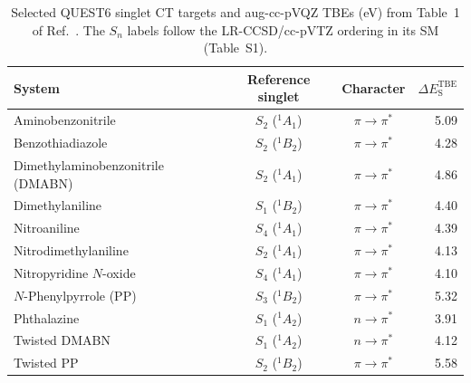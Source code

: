 \begin{table}[htbp]
\centering
\caption{Selected QUEST6 singlet CT targets and aug-cc-pVQZ TBEs (eV) from Table~1 of Ref.~. The $S_n$ labels follow the LR-CCSD/cc-pVTZ ordering in its SM (Table~S1).}
\label{tab:si_states_quest6}
\small
\setlength{\tabcolsep}{6pt}
\begin{tabular}{@{}lccr@{}}
\hline
System & Reference singlet & Character & $\Delta E_{\mathrm{S}}^{\mathrm{TBE}}$ \\
\hline
Aminobenzonitrile & $S_{2}$ (${}^{1}A_1$) & $\pi\to\pi^*$ & 5.09 \\
Benzothiadiazole & $S_{2}$ (${}^{1}B_2$) & $\pi\to\pi^*$ & 4.28 \\
Dimethylaminobenzonitrile (DMABN) & $S_{2}$ (${}^{1}A_1$) & $\pi\to\pi^*$ & 4.86 \\
Dimethylaniline & $S_{1}$ (${}^{1}B_2$) & $\pi\to\pi^*$ & 4.40 \\
Nitroaniline & $S_{4}$ (${}^{1}A_1$) & $\pi\to\pi^*$ & 4.39 \\
Nitrodimethylaniline & $S_{2}$ (${}^{1}A_1$) & $\pi\to\pi^*$ & 4.13 \\
Nitropyridine $N$-oxide & $S_{4}$ (${}^{1}A_1$) & $\pi\to\pi^*$ & 4.10 \\
$N$-Phenylpyrrole (PP) & $S_{3}$ (${}^{1}B_2$) & $\pi\to\pi^*$ & 5.32 \\
Phthalazine & $S_{1}$ (${}^{1}A_2$) & $n\to\pi^*$ & 3.91 \\
Twisted DMABN & $S_{1}$ (${}^{1}A_2$) & $n\to\pi^*$ & 4.12 \\
Twisted PP & $S_{2}$ (${}^{1}B_2$) & $\pi\to\pi^*$ & 5.58 \\
\hline\hline
\end{tabular}
\end{table}
